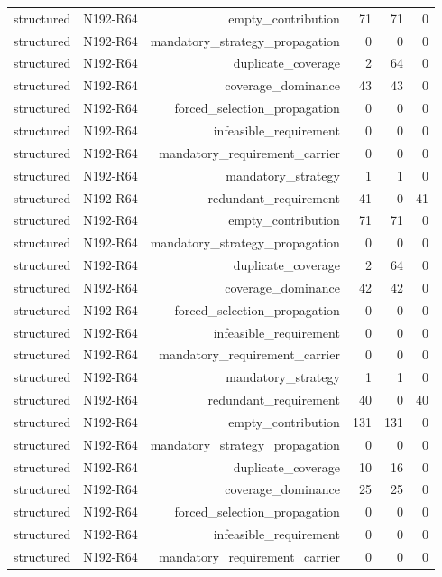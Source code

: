 {\begin{longtable}{lrrrrr}
structured & N192-R64 & empty\_contribution & 71 & 71 & 0 \\
structured & N192-R64 & mandatory\_strategy\_propagation & 0 & 0 & 0 \\
structured & N192-R64 & duplicate\_coverage & 2 & 64 & 0 \\
structured & N192-R64 & coverage\_dominance & 43 & 43 & 0 \\
structured & N192-R64 & forced\_selection\_propagation & 0 & 0 & 0 \\
structured & N192-R64 & infeasible\_requirement & 0 & 0 & 0 \\
structured & N192-R64 & mandatory\_requirement\_carrier & 0 & 0 & 0 \\
structured & N192-R64 & mandatory\_strategy & 1 & 1 & 0 \\
structured & N192-R64 & redundant\_requirement & 41 & 0 & 41 \\
structured & N192-R64 & empty\_contribution & 71 & 71 & 0 \\
structured & N192-R64 & mandatory\_strategy\_propagation & 0 & 0 & 0 \\
structured & N192-R64 & duplicate\_coverage & 2 & 64 & 0 \\
structured & N192-R64 & coverage\_dominance & 42 & 42 & 0 \\
structured & N192-R64 & forced\_selection\_propagation & 0 & 0 & 0 \\
structured & N192-R64 & infeasible\_requirement & 0 & 0 & 0 \\
structured & N192-R64 & mandatory\_requirement\_carrier & 0 & 0 & 0 \\
structured & N192-R64 & mandatory\_strategy & 1 & 1 & 0 \\
structured & N192-R64 & redundant\_requirement & 40 & 0 & 40 \\
structured & N192-R64 & empty\_contribution & 131 & 131 & 0 \\
structured & N192-R64 & mandatory\_strategy\_propagation & 0 & 0 & 0 \\
structured & N192-R64 & duplicate\_coverage & 10 & 16 & 0 \\
structured & N192-R64 & coverage\_dominance & 25 & 25 & 0 \\
structured & N192-R64 & forced\_selection\_propagation & 0 & 0 & 0 \\
structured & N192-R64 & infeasible\_requirement & 0 & 0 & 0 \\
structured & N192-R64 & mandatory\_requirement\_carrier & 0 & 0 & 0 \\

\end{longtable}}
